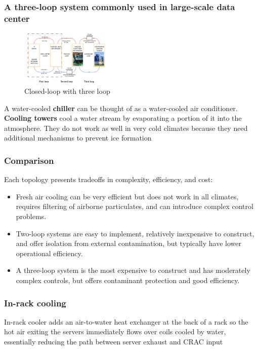\documentclass[10pt, oneside]{article}
\begin{document}
\subsubsection*{A three-loop system commonly used in large-scale data center}
\begin{figure}[H]
    \begin{center}
    \includegraphics[width=0.4\textwidth]{img/img28.png}
    \caption{Closed-loop with three loop}
    \label{fig:Closed-loop with three loop}
    \end{center}
\end{figure}
A water-cooled {\bf chiller} can be thought of as a water-cooled air conditioner.\\
\newline
{\bf Cooling towers} cool a water stream by evaporating a portion of it into the atmosphere. They do not work as well in very cold climates because they need additional mechanisms to prevent ice formation
\subsubsection{Comparison}
Each topology presents tradeoffs in complexity, efficiency, and cost:
\begin{itemize}
    \item Fresh air cooling can be very efficient but does not work in all climates, requires filtering of airborne particulates, and can introduce complex control problems.
    \item Two-loop systems are easy to implement, relatively inexpensive to construct, and offer isolation from external contamination, but typically have lower operational efficiency.
    \item A three-loop system is the most expensive to construct and has moderately complex controls, but offers contaminant protection and good efficiency.
\end{itemize}
\subsubsection{In-rack cooling}
In-rack cooler adds an air-to-water heat exchanger at the back of a rack so the hot air exiting the servers immediately flows over coils cooled by water, essentially reducing the path between server exhaust and CRAC input
\end{document}

